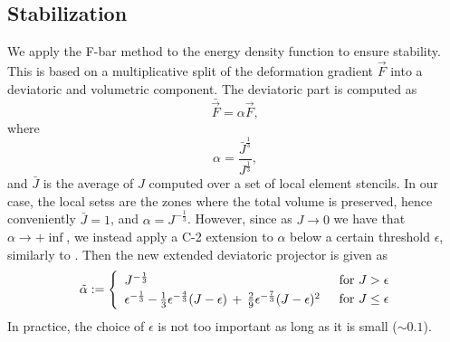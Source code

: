 
\subsection{Stabilization}
We apply the F-bar method \cite{neto:2005} to the energy density function to ensure stability. 
This is based on a multiplicative split of the deformation gradient $\vec{F}$ into 
a deviatoric and volumetric component. The deviatoric part is computed as
\begin{equation}
\bar{\vec{F}}= \alpha \vec{F},
\label{eq:F-bar}
\end{equation}
where
\begin{equation}
\alpha = \frac{\bar{J}^{\frac{1}{3}}}{J^{\frac{1}{3}}},
\label{eq:F-bar_alpha}
\end{equation}
and $\bar{J}$ is the average of $J$ computed over a set of local element stencils. In our case, the
local setss are the zones where the total volume is preserved, hence conveniently 
$\bar{J} = 1$, and $\alpha = J^{-\frac{1}{3}}$. However, since as $J \rightarrow 0$ we have that $\alpha \rightarrow +\inf$, we instead apply a C-2 extension to $\alpha$ below a certain threshold $\epsilon$, similarly to \cite{Stomakhin:2012}. Then the new extended deviatoric projector is given as
\begin{align}
\tilde{\alpha} := 
\begin{cases}
\begin{array}{l} J^{-\frac{1}{3}} \end{array}  & \text{for } J > \epsilon\\
\begin{array}{l@{}l}
\epsilon^{-\frac{1}{3}} &\,-\, \frac{1}{3} \epsilon^{-\frac{4}{3}} (J - \epsilon)
\,+\, \frac{2}{9} \epsilon^{-\frac{7}{3}} (J - \epsilon)^2
\end{array} & \text{for } J \leq \epsilon
\end{cases}
\label{eq:c2}
\end{align}
In practice, the choice of $\epsilon$ is not too important as long as it is small ($\sim 0.1$). 

